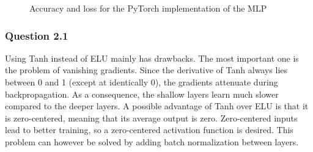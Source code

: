 \documentclass{article}
\begin{document}
\begin{figure}[H]
	\centering
	\caption{Accuracy and loss for the PyTorch implementation of the MLP}
	\label{fig:torchcurves}
\end{figure}
\subsubsection*{Question 2.1}
Using Tanh instead of ELU mainly has drawbacks. The most important one is the problem of vanishing gradients. Since the derivative of Tanh always lies between 0 and 1 (except at identically 0), the gradients attenuate during backpropagation. As a consequence, the shallow layers learn much slower compared to the deeper layers. A possible advantage of Tanh over ELU is that it is zero-centered, meaning that its average output is zero. Zero-centered inputs lead to better training, so a zero-centered activation function is desired. This problem can however be solved by adding batch normalization between layers.
\end{document}
